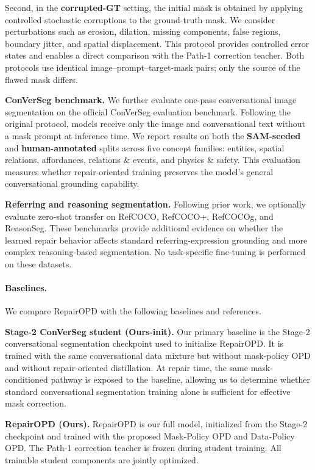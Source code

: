 Second, in the \textbf{corrupted-GT} setting, the initial mask is obtained by applying controlled stochastic corruptions to the ground-truth mask.
We consider perturbations such as erosion, dilation, missing components, false regions, boundary jitter, and spatial displacement.
This protocol provides controlled error states and enables a direct comparison with the Path-1 correction teacher.
Both protocols use identical image--prompt--target-mask pairs; only the source of the flawed mask differs.

\noindent\textbf{ConVerSeg benchmark.}
We further evaluate one-pass conversational image segmentation on the official ConVerSeg evaluation benchmark.
Following the original protocol, models receive only the image and conversational text without a mask prompt at inference time.
We report results on both the \textbf{SAM-seeded} and \textbf{human-annotated} splits across five concept families:
entities, spatial relations, affordances, relations \& events, and physics \& safety.
This evaluation measures whether repair-oriented training preserves the model's general conversational grounding capability.

\noindent\textbf{Referring and reasoning segmentation.}
Following prior work, we optionally evaluate zero-shot transfer on RefCOCO, RefCOCO+, RefCOCOg, and ReasonSeg.
These benchmarks provide additional evidence on whether the learned repair behavior affects standard referring-expression grounding and more complex reasoning-based segmentation.
No task-specific fine-tuning is performed on these datasets.


\paragraph{Baselines.}
We compare RepairOPD with the following baselines and references.

\noindent\textbf{Stage-2 ConVerSeg student (Ours-init).}
Our primary baseline is the Stage-2 conversational segmentation checkpoint used to initialize RepairOPD.
It is trained with the same conversational data mixture but without mask-policy OPD and without repair-oriented distillation.
At repair time, the same mask-conditioned pathway is exposed to the baseline, allowing us to determine whether standard conversational segmentation training alone is sufficient for effective mask correction.

\noindent\textbf{RepairOPD (Ours).}
RepairOPD is our full model, initialized from the Stage-2 checkpoint and trained with the proposed Mask-Policy OPD and Data-Policy OPD.
The Path-1 correction teacher is frozen during student training.
All trainable student components are jointly optimized.

